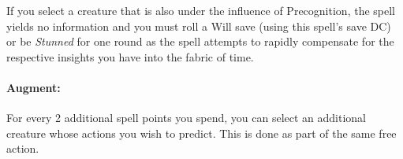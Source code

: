 If you select a creature that is also under the influence of Precognition, the spell yields no information 
and you must roll a Will save (using this spell's save DC) or be \emph{Stunned} for one round
as the spell attempts to rapidly compensate for the respective insights you have into the fabric of time.

\paragraph{Augment:} For every 2 additional spell points you spend, you can select an additional creature whose actions you wish to predict.
This is done as part of the same free action.
% 
% 
